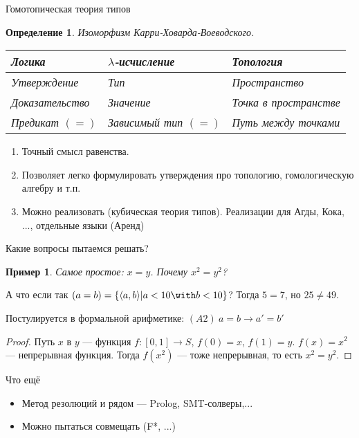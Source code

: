\documentclass[aspectratio=169]{beamer}
\newtheorem{dfn}{Определение}[section]
\newtheorem{exm}{Пример}[section]
\begin{document}
\begin{frame}{Гомотопическая теория типов}
\begin{dfn}Изоморфизм Карри-Ховарда-Воеводского.

\begin{tabular}{lll}
Логика & $\lambda$-исчисление & Топология\\\hline
Утверждение & Тип & Пространство \\
Доказательство & Значение & Точка в пространстве\\
Предикат $(=)$ & Зависимый тип $(=)$ & Путь между точками
\end{tabular}\end{dfn}

\begin{enumerate}
\item Точный смысл равенства.
\item Позволяет легко формулировать утверждения про топологию, гомологическую алгебру и т.п.
\item Можно реализовать (кубическая теория типов). Реализации для Агды, Кока, ..., отдельные языки (Аренд)
\end{enumerate}
\end{frame}

\begin{frame}{Какие вопросы пытаемся решать?}
\begin{exm}Самое простое: $x=y$. Почему $x^2 = y^2$?\end{exm} \pause

А что если так $(a = b) = \{ \langle a,b \rangle | a < 10 \with b < 10 \}$?
Тогда $5=7$, но $25 \ne 49$. \pause

Постулируется в формальной арифметике: $(A2)\ a = b \rightarrow a' = b'$ \pause

\begin{proof}Путь $x$ в $y$ --- функция $f: [0,1] \rightarrow S$, 
$f(0)=x$, $f(1)=y$. $f(x) = x^2$ --- непрерывная функция. Тогда $f(x^2)$ --- тоже непрерывная,
то есть $x^2 = y^2$.\end{proof}
\end{frame}

\begin{frame}{Что ещё}
\begin{itemize}
\item Метод резолюций и рядом --- Prolog, SMT-солверы,...
\item Можно пытаться совмещать (F*, ...)
\end{itemize}
\end{frame}
\end{document}
